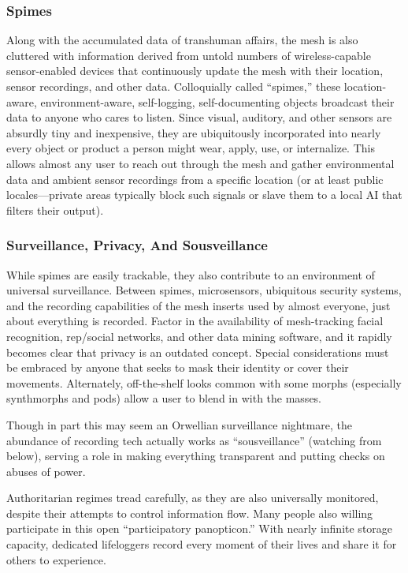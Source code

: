 \subsubsection{Spimes} 

Along with the accumulated data of transhuman affairs, the mesh is also cluttered with information derived from untold numbers of wireless-capable sensor-enabled devices that continuously update the mesh with their location, sensor recordings, and other data. Colloquially called ``spimes,'' these location-aware, environment-aware, self-logging, self-documenting objects broadcast their data to anyone who cares to listen. Since visual, auditory, and other sensors are absurdly tiny and inexpensive, they are ubiquitously incorporated into nearly every object or product a person might wear, apply, use, or internalize. This allows almost any user to reach out through the mesh and gather environmental data and ambient sensor recordings from a specific location (or at least public locales—private areas typically block such signals or slave them to a local AI that filters their output). 

\subsubsection{Surveillance, Privacy, And Sousveillance} 

While spimes are easily trackable, they also contribute to an environment of universal surveillance. Between spimes, microsensors, ubiquitous security systems, and the recording capabilities of the mesh inserts used by almost everyone, just about everything is recorded. Factor in the availability of mesh-tracking facial recognition, rep/social networks, and other data mining software, and it rapidly becomes clear that privacy is an outdated concept. Special considerations must be embraced by anyone that seeks to mask their identity or cover their movements. Alternately, off-the-shelf looks common with some morphs (especially synthmorphs and pods) allow a user to blend in with the masses. 

Though in part this may seem an Orwellian surveillance nightmare, the abundance of recording tech actually works as ``sousveillance'' (watching from below), serving a role in making everything transparent and putting checks on abuses of power. 

Authoritarian regimes tread carefully, as they are also universally monitored, despite their attempts to control information flow. Many people also willing participate in this open ``participatory panopticon.'' With nearly infinite storage capacity, dedicated lifeloggers record every moment of their lives and share it for others to experience. 


